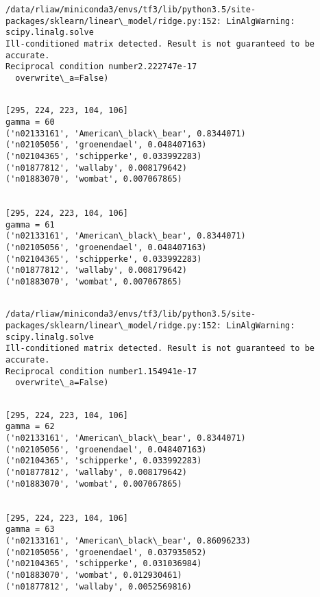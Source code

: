 \documentclass[11pt]{article}
\begin{document}
    \begin{Verbatim}[commandchars=\\\{\}]
/data/rliaw/miniconda3/envs/tf3/lib/python3.5/site-packages/sklearn/linear\_model/ridge.py:152: LinAlgWarning: scipy.linalg.solve
Ill-conditioned matrix detected. Result is not guaranteed to be accurate.
Reciprocal condition number2.222747e-17
  overwrite\_a=False)

    \end{Verbatim}

    \begin{Verbatim}[commandchars=\\\{\}]

[295, 224, 223, 104, 106]
gamma = 60
('n02133161', 'American\_black\_bear', 0.8344071)
('n02105056', 'groenendael', 0.048407163)
('n02104365', 'schipperke', 0.033992283)
('n01877812', 'wallaby', 0.008179642)
('n01883070', 'wombat', 0.007067865)


[295, 224, 223, 104, 106]
gamma = 61
('n02133161', 'American\_black\_bear', 0.8344071)
('n02105056', 'groenendael', 0.048407163)
('n02104365', 'schipperke', 0.033992283)
('n01877812', 'wallaby', 0.008179642)
('n01883070', 'wombat', 0.007067865)


    \end{Verbatim}

    \begin{Verbatim}[commandchars=\\\{\}]
/data/rliaw/miniconda3/envs/tf3/lib/python3.5/site-packages/sklearn/linear\_model/ridge.py:152: LinAlgWarning: scipy.linalg.solve
Ill-conditioned matrix detected. Result is not guaranteed to be accurate.
Reciprocal condition number1.154941e-17
  overwrite\_a=False)

    \end{Verbatim}

    \begin{Verbatim}[commandchars=\\\{\}]

[295, 224, 223, 104, 106]
gamma = 62
('n02133161', 'American\_black\_bear', 0.8344071)
('n02105056', 'groenendael', 0.048407163)
('n02104365', 'schipperke', 0.033992283)
('n01877812', 'wallaby', 0.008179642)
('n01883070', 'wombat', 0.007067865)


[295, 224, 223, 104, 106]
gamma = 63
('n02133161', 'American\_black\_bear', 0.86096233)
('n02105056', 'groenendael', 0.037935052)
('n02104365', 'schipperke', 0.031036984)
('n01883070', 'wombat', 0.012930461)
('n01877812', 'wallaby', 0.0052569816)


    \end{Verbatim}
\end{document}
